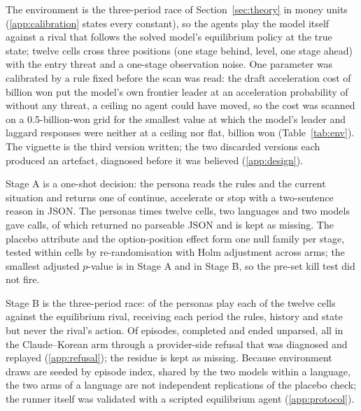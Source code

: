 \documentclass[preprint,12pt,authoryear]{elsarticle}
\begin{document}
The environment is the three-period race of Section~\ref{sec:theory} in money units (\ref{app:calibration} states every constant), so the agents play the model itself against a rival that follows the solved model's equilibrium policy at the true state; twelve cells cross three positions (one stage behind, level, one stage ahead) with the entry threat and a one-stage observation noise. One parameter was calibrated by a rule fixed before the scan was read: the draft acceleration cost of \EnvDraftAccelCostBn{} billion won put the model's own frontier leader at an acceleration probability of \EnvDraftLeaderAccelNoThreat{} without any threat, a ceiling no agent could have moved, so the cost was scanned on a 0.5-billion-won grid for the smallest value at which the model's leader and laggard responses were neither at a ceiling nor flat, \EnvAccelCostBn{} billion won (Table~\ref{tab:env}). The vignette is the third version written; the two discarded versions each produced an artefact, diagnosed before it was believed (\ref{app:design}).

Stage A is a one-shot decision: the persona reads the rules and the current situation and returns one of continue, accelerate or stop with a two-sentence reason in JSON. The \StageAPersonas{} personas times twelve cells, two languages and two models gave \StageACalls{} calls, of which \StageAParseFail{} returned no parseable JSON and is kept as missing. The placebo attribute and the option-position effect form one null family per stage, tested within cells by re-randomisation with Holm adjustment across arms; the smallest adjusted $p$-value is \StageAPlaceboMinHolm{} in Stage A and \StageBPlaceboMinHolm{} in Stage B, so the pre-set kill test did not fire.

Stage B is the three-period race: \StageBPersonas{} of the personas play each of the twelve cells against the equilibrium rival, receiving each period the rules, history and state but never the rival's action. Of \StageBEpisodes{} episodes, \StageBComplete{} completed and \StageBParseFailed{} ended unparsed, all in the Claude--Korean arm through a provider-side refusal that was diagnosed and replayed (\ref{app:refusal}); the residue is kept as missing. Because environment draws are seeded by episode index, shared by the two models within a language, the two arms of a language are not independent replications of the placebo check; the runner itself was validated with a scripted equilibrium agent (\ref{app:protocol}).
\end{document}
